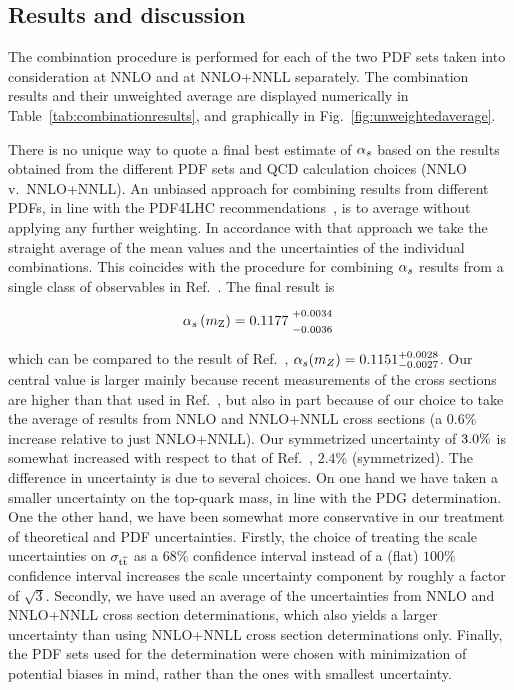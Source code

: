 \subsection{Results and discussion}


The combination procedure is performed for each of the two PDF sets
taken into consideration at NNLO and at NNLO+NNLL separately. The
combination results and their unweighted average are displayed
numerically in Table~\ref{tab:combinationresults}, and graphically in
Fig.~\ref{fig:unweightedaverage}.

There is no unique way to quote a final best estimate of $\alpha_s$ based
on the results obtained from the different PDF sets and QCD
calculation choices (NNLO v.\ NNLO+NNLL).
%
An unbiased approach for combining results from different PDFs, in
line with the PDF4LHC recommendations~\cite{Butterworth:2015oua}, is to average
without applying any further weighting.
%
In accordance with that approach we take the straight average of the mean
values and the uncertainties of the individual combinations.
%
This coincides with the procedure for combining $\alpha_s$ results from a
single class of observables in Ref.~\cite{pdg}.
%
The final result is
\begin{linenomath*}
\begin{equation}
\asmz =
    \alphasResultCenter
    \; {}^{\highersub{$+\alphasResultRightError${}}}_{\lowersub{$-\alphasResultLeftError${} }}
\end{equation}
\end{linenomath*}
%
which can be compared to the result of Ref.~\cite{Chatrchyan:2013haa},
$\alpha_s(m_Z) = 0.1151^{+0.0028}_{-0.0027}$.
%
Our central value is larger mainly because recent measurements of the
cross sections are higher than that used in
Ref.~\cite{Chatrchyan:2013haa}, but also in part because of our choice
to take the average of results from NNLO and NNLO+NNLL cross sections
(a $0.6\%$ increase relative to just NNLO+NNLL).
%
Our symmetrized uncertainty of $3.0\%$ is
somewhat increased with respect to that of
Ref.~\cite{Chatrchyan:2013haa}, $2.4\%$ (symmetrized).
%
The difference in uncertainty is due to several choices.
%
On one hand we have taken a smaller uncertainty on the top-quark mass,
in line with the PDG determination.
%
One the other hand, we have been somewhat more conservative in our
treatment of theoretical and PDF uncertainties.
%
Firstly, the choice of treating the scale uncertainties on $\sigma_{\mathrm{t}\overline{\mathrm{t}}}$ as a
$68\%$ confidence interval instead of a (flat) $100\%$ confidence
interval increases the scale uncertainty component by roughly a factor
of $\sqrt{3}$.
%
Secondly, we have used an average of the uncertainties from NNLO and
NNLO+NNLL cross section determinations, which also yields a larger
uncertainty than using NNLO+NNLL cross section determinations only.
%
Finally, the PDF sets used for the determination were chosen with
minimization of potential biases in mind, rather than the ones with
smallest uncertainty.
%


